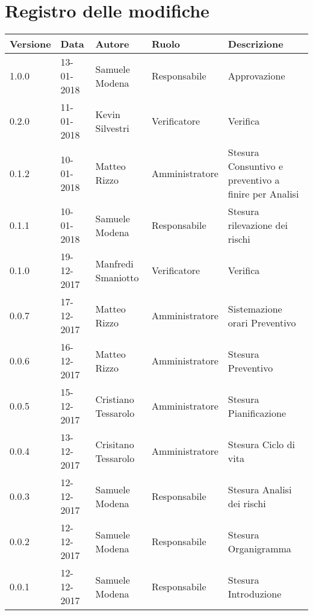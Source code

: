 \documentclass[./PianodiProgetto.tex]{subfiles}
\begin{document}
\chapter*{Registro delle modifiche}
\setlength\LTleft{-22mm}
\begin{longtable}{|p{20mm}|p{20mm}|p{40mm}|p{30mm}|p{50mm}|}
	\hline
	\textbf{Versione} & \textbf{Data} & \textbf{Autore} & \textbf{Ruolo} & \textbf{Descrizione} \\ 
		\hline 1.0.0 & 13-01-2018 & Samuele Modena & Responsabile & Approvazione \\
 
		\hline 0.2.0 & 11-01-2018 & Kevin Silvestri & Verificatore & Verifica \\
 
		\hline 0.1.2 & 10-01-2018 & Matteo Rizzo & Amministratore & Stesura Consuntivo e preventivo a finire per Analisi \\
 
		\hline 0.1.1 & 10-01-2018 & Samuele Modena & Responsabile & Stesura rilevazione dei rischi \\
 
		\hline 0.1.0 & 19-12-2017 & Manfredi Smaniotto & Verificatore & Verifica \\
 		
 		\hline 0.0.7 & 17-12-2017 & Matteo Rizzo & Amministratore & Sistemazione orari Preventivo \\
 		
		\hline 0.0.6 & 16-12-2017 & Matteo Rizzo & Amministratore & Stesura Preventivo \\
 
		\hline 0.0.5 & 15-12-2017 & Cristiano Tessarolo & Amministratore & Stesura Pianificazione \\
 
		\hline 0.0.4 & 13-12-2017 & Crisitano Tessarolo & Amministratore & Stesura Ciclo di vita \\
 
		\hline 0.0.3 & 12-12-2017 & Samuele Modena & Responsabile & Stesura Analisi dei rischi \\
 
 		\hline 0.0.2 & 12-12-2017 & Samuele Modena & Responsabile & Stesura Organigramma \\
 		
		\hline 0.0.1 & 12-12-2017 & Samuele Modena & Responsabile & Stesura Introduzione \\
 
		\hline
 
	\end{longtable}
\end{document}
